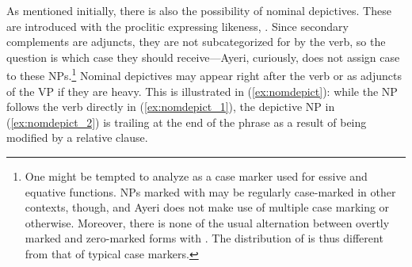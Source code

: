 As mentioned initially, there is also the possibility of nominal depictives.
These are introduced with the proclitic expressing likeness, .
Since secondary complements are adjuncts, they are not subcategorized for by
the verb, so the question is which case they should receive---Ayeri, curiously,
does not assign case to these NPs.\footnote{One might be tempted to analyze
 as a case marker used for essive and equative functions.
NPs marked with  may be regularly case-marked in other contexts,
though, and Ayeri does not make use of multiple case marking or
 otherwise. Moreover, there is none of the usual alternation
between overtly marked and zero-marked forms with . The
distribution of  is thus different from that of typical case
markers.} Nominal depictives may appear right after the verb or as adjuncts of
the VP if they are heavy. This is illustrated in (\ref{ex:nomdepict}): while
the NP  follows the verb directly in
(\ref{ex:nomdepict_1}), the depictive NP  in (\ref{ex:nomdepict_2}) is trailing at the
end of the phrase as a result of being modified by a relative clause.

